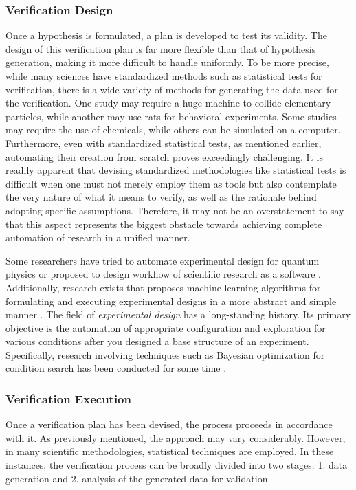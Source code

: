 \documentclass{book}
\begin{document}
\subsubsection{Verification Design}

Once a hypothesis is formulated, a plan is developed to test its validity. The design of this verification plan is far more flexible than that of hypothesis generation, making it more difficult to handle uniformly. To be more precise, while many sciences have standardized methods such as statistical tests for verification, there is a wide variety of methods for generating the data used for the verification. One study may require a huge machine to collide elementary particles, while another may use rats for behavioral experiments. Some studies may require the use of chemicals, while others can be simulated on a computer. Furthermore, even with standardized statistical tests, as mentioned earlier, automating their creation from scratch proves exceedingly challenging. It is readily apparent that devising standardized methodologies like statistical tests is difficult when one must not merely employ them as tools but also contemplate the very nature of what it means to verify, as well as the rationale behind adopting specific assumptions. Therefore, it may not be an overstatement to say that this aspect represents the biggest obstacle towards achieving complete automation of research in a unified manner.

Some researchers have tried to automate experimental design for quantum physics \cite{ruiz2022digital} or proposed to design workflow of scientific research as a software \cite{goble2020fair}. Additionally, research exists that proposes machine learning algorithms for formulating and executing experimental designs in a more abstract and simple manner \cite{herrmann2022learning}. The field of \textit{experimental design} has a long-standing history. Its primary objective is the automation of appropriate configuration and exploration for various conditions after you designed a base structure of an experiment. Specifically, research involving techniques such as Bayesian optimization for condition search has been conducted for some time \cite{chaloner1995bayesian,shahriari2015taking}.

\subsubsection{Verification Execution}

Once a verification plan has been devised, the process proceeds in accordance with it. As previously mentioned, the approach may vary considerably. However, in many scientific methodologies, statistical techniques are employed. In these instances, the verification process can be broadly divided into two stages: 1. data generation and 2. analysis of the generated data for validation.
\end{document}
